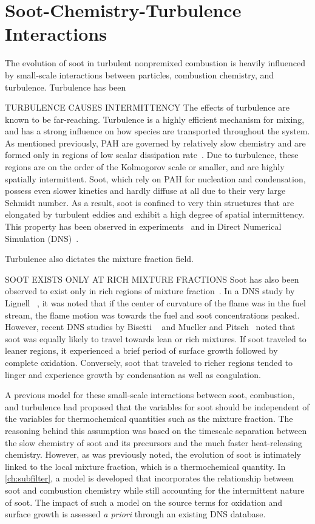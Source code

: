 \section{Soot-Chemistry-Turbulence Interactions}
\label{sec:intro:scti}

The evolution of soot in turbulent nonpremixed combustion is heavily influenced by small-scale interactions between particles, combustion chemistry, and turbulence. Turbulence has been 

TURBULENCE CAUSES INTERMITTENCY
The effects of turbulence are known to be far-reaching. Turbulence is a highly efficient mechanism for mixing, and has a strong influence on how species are transported throughout the system. As mentioned previously, PAH are governed by relatively slow chemistry and are formed only in regions of low scalar dissipation rate~\cite{}. Due to turbulence, these regions are on the order of the Kolmogorov scale or smaller, and are highly spatially intermittent. Soot, which rely on PAH for nucleation and condensation, possess even slower kinetics and hardly diffuse at all due to their very large Schmidt number. As a result, soot is confined to very thin structures that are elongated by turbulent eddies and exhibit a high degree of spatial intermittency. This property has been observed in experiments~\cite{} and in Direct Numerical Simulation (DNS)~\cite{}.

Turbulence also dictates the mixture fraction field.

SOOT EXISTS ONLY AT RICH MIXTURE FRACTIONS
Soot has also been observed to exist only in rich regions of mixture fraction~\cite{DNS,experiment}. In a DNS study by Lignell \etal~\cite{lignell}, it was noted that if the center of curvature of the flame was in the fuel stream, the flame motion was towards the fuel and soot concentrations peaked. However, recent DNS studies by Bisetti \etal~\cite{bisetti} and Mueller and Pitsch~\cite{mueller2012} noted that soot was equally likely to travel towards lean or rich mixtures. If soot traveled to leaner regions, it experienced a brief period of surface growth followed by complete oxidation. Conversely, soot that traveled to richer regions tended to linger and experience growth by condensation as well as coagulation.

A previous model for these small-scale interactions between soot, combustion, and turbulence had proposed that the variables for soot should be independent of the variables for thermochemical quantities such as the mixture fraction. The reasoning behind this assumption was based on the timescale separation between the slow chemistry of soot and its precursors and the much faster heat-releasing chemistry. However, as was previously noted, the evolution of soot is intimately linked to the local mixture fraction, which is a thermochemical quantity. In \cref{ch:subfilter}, a model is developed that incorporates the relationship between soot and combustion chemistry while still accounting for the intermittent nature of soot. The impact of such a model on the source terms for oxidation and surface growth is assessed \textit{a priori} through an existing DNS database.

